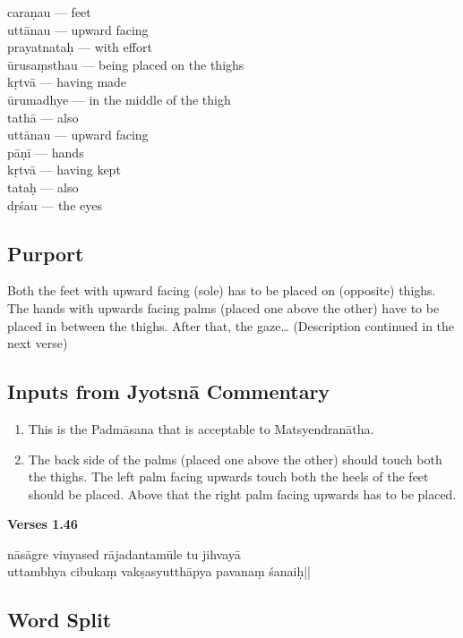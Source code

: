 \begin{multicols}{2}
caraṇau --- feet  \\
uttānau --- upward facing  \\
prayatnataḥ --- with effort  \\
ūrusaṃsthau ---  being placed on the thighs  \\
kṛtvā --- having made  \\
ūrumadhye --- in the middle of the thigh  \\
tathā ---  also  \\
uttānau ---  upward facing  \\
pāṇī ---  hands  \\
kṛtvā ---  having kept  \\
tataḥ ---  also  \\
dṛśau --- the eyes
\end{multicols}

\subsection*{Purport}

Both the feet with upward facing (sole) has to be placed on (opposite) thighs. The hands with upwards facing palms (placed one above the other) have to be placed in between the thighs. After that, the gaze… (Description continued in the next verse)

\subsection*{Inputs from Jyotsnā Commentary}

\begin{enumerate}
\item This is the Padmāsana that is acceptable to Matsyendranātha.
\item The back side of the palms (placed one above the other) should touch both the thighs. The left palm facing upwards touch both the heels of the feet should be placed. Above that the right palm facing upwards has to be placed.
\end{enumerate}

\newpage
\noindent \textbf{Verses 1.46}

\begin{shloka}
nāsāgre vinyased rājadantamūle tu jihvayā\\
uttambhya cibukaṃ vakṣasyutthāpya pavanaṃ śanaiḥ||
\end{shloka}

\subsection*{Word Split}

